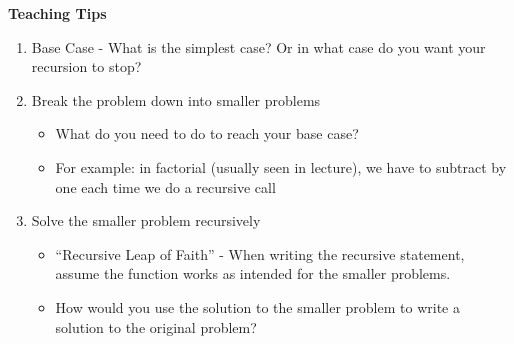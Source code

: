 \begin{blocksection}
\begin{guide}
\textbf{Teaching Tips}
\begin{enumerate}
	    \item Base Case - What is the simplest case? Or in what case do you want your recursion to stop?
	    \item Break the problem down into smaller problems
	    \begin{itemize}
			\item What do you need to do to reach your base case? 
			\item For example: in factorial (usually seen in lecture), we have to subtract by one each time we do a recursive call
		\end{itemize}
		\item Solve the smaller problem recursively
		\begin{itemize}
			\item “Recursive Leap of Faith” - When writing the recursive statement, assume the function works as intended for the smaller problems.
			\item How would you use the solution to the smaller problem to write a solution to the original problem?
		\end{itemize}
\end{enumerate}
\end{guide}
\end{blocksection}